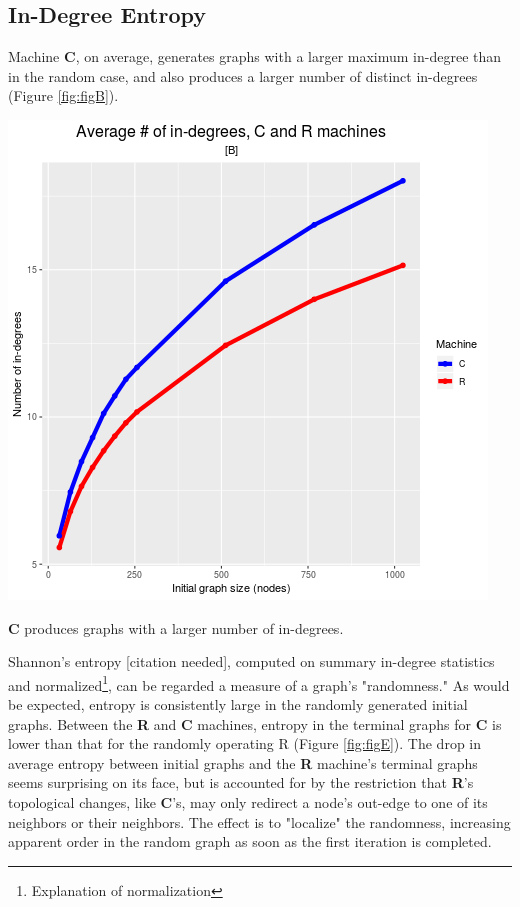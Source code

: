 \documentclass{tufte-handout}
\begin{document}
\clearpage
\subsection{In-Degree Entropy}

Machine \textbf{C}, on average, generates graphs with a larger 
maximum in-degree than in the random case, and also produces a
larger number of distinct in-degrees (Figure \ref{fig:figB}).

\begin{marginfigure}
  \includegraphics{figB.png}
  \caption{\textbf{C} produces graphs with a larger number of in-degrees.}
  \label{fig:figB}
\end{marginfigure}

Shannon's entropy [citation needed], computed on summary in-degree statistics and
normalized\footnote{Explanation of normalization}, can be regarded a measure of
a graph's "randomness."
As would be expected, entropy is consistently large in the randomly generated
initial graphs. Between the \textbf{R} and \textbf{C} machines, entropy in the terminal
graphs for \textbf{C} is lower than that for the randomly operating R (Figure \ref{fig:figE}).
The drop in average entropy between initial graphs and the \textbf{R} machine's terminal
graphs seems surprising on its face, but is accounted for by the restriction that
\textbf{R}'s topological changes, like \textbf{C}'s, may only redirect a node's out-edge
to one of its neighbors or their neighbors.
The effect is to "localize" the randomness, increasing apparent order in the random graph as
soon as the first iteration is completed.
\end{document}

